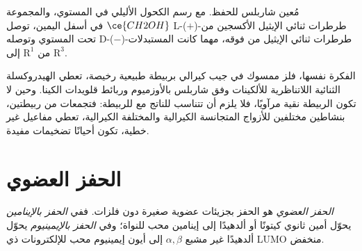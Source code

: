 \begin{omfigure}

{\small مُعين شاربلس للحفظ. مع رسم الكحول الأليلي في المستوي، 
والمجموعة $\ce{CH2OH}$ في أسفل اليمين، توصل L-($+$)-طرطرات ثنائي الإيثيل الأكسجين من
تحت المستوي وتوصله D-($-$)-طرطرات ثنائي الإيثيل من فوقه، مهما كانت
المستبدلات من $\mathrm R^1$ إلى $\mathrm R^3$.}
\end{omfigure}

الفكرة نفسها، فلز ممسوك في جيب كيرالي بربيطة طبيعية رخيصة، تعطي
الهيدروكسلة الثنائية اللاتناظرية للألكينات وفق شاربلس بالأوزميوم وربائط قلويدات
الكينا. وحين لا تكون الربيطة نقية مرآويًا، فلا يلزم أن تتناسب  للناتج
مع  للربيطة: فتجمعات من ربيطتين، بنشاطين
مختلفين للأزواج المتجانسة الكيرالية والمختلفة الكيرالية، تعطي مفاعيل غير
خطية، تكون أحيانًا تضخيمات مفيدة.

\section{الحفز العضوي}

\begin{definition}\label{def:b3:asymmetric-synthesis:organocatalysis}
\emph{الحفز العضوي} هو الحفز بجزيئات عضوية صغيرة
دون فلزات. ففي \emph{الحفز بالإينامين} يحوّل
أمين ثانوي كيتونًا أو ألدهيدًا إلى إينامين محب للنواة؛ وفي
\emph{الحفز بالإيمينيوم} يحوّل ألدهيدًا غير مشبع $\alpha,\beta$
إلى أيون إيمينيوم محب للإلكترونات ذي LUMO منخفض.
\end{definition}

